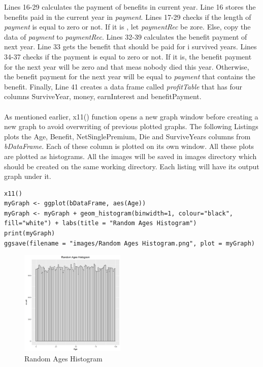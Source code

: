 \documentclass[12pt]{article}
\begin{document}
Lines 16-29 calculates the payment of benefits in current year. Line 16 stores the benefits paid in the current year in \textit{payment}. Lines 17-29 checks if the length of \textit{payment} is equal to zero or not. If it is , let \textit{paymentRec} be zore. Else, copy the data of \textit{payment} to \textit{paymentRec}. Lines 32-39 calculates the benefit payment of next year.
Line 33 gets the benefit that should be paid for i survived years. Lines 34-37 checks if the payment is equal to zero or not. If it is, the benefit payment for the next year will be zero and that meas nobody died this year. Otherwise, the benefit payment for the next year will be equal to \textit{payment} that contains the benefit. Finally, Line 41 creates a data frame called \textit{profitTable} that has four columns SurviveYear, money, earnInterest and benefitPayment.
\\
\\
As mentioned earlier, x11() function opens a new graph window before creating a new graph to avoid overwriting of previous plotted graphs.  The following Listings  plots the Age, Benefit, NetSinglePremium, Die and SurviveYears columns from \textit{bDataFrame}. Each of these column is plotted on its own window. All these plots are plotted as histograms. All the images will be saved in images directory which should be created on the same working directory. Each listing  will have its output graph under it.

\begin{lstlisting}[caption={ Random Ages Histogram},captionpos=b,label={list:L10}]
x11()
myGraph <- ggplot(bDataFrame, aes(Age))
myGraph <- myGraph + geom_histogram(binwidth=1, colour="black", fill="white") + labs(title = "Random Ages Histogram")
print(myGraph)
ggsave(filename = "images/Random Ages Histogram.png", plot = myGraph)
\end{lstlisting}

\begin{figure}[h]
	\centering
	\includegraphics[width=0.5\linewidth, height=5cm]{S2.png}
	\caption{Random Ages Histogram }
	
\end{figure}
\end{document}
